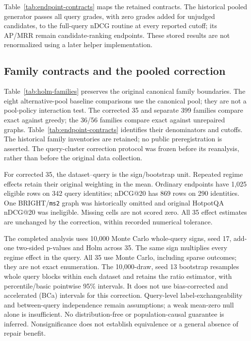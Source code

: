 \documentclass[pdflatex,sn-basic,Numbered]{sn-jnl}
\begin{document}
Table~\ref{tab:endpoint-contracts} maps the retained contracts. The historical pooled generator passes all query grades, with zero grades added for unjudged candidates, to the full-query nDCG routine at every reported cutoff; its AP/MRR remain candidate-ranking endpoints. These stored results are not renormalized using a later helper implementation.


\subsection{Family contracts and the pooled correction}
Table~\ref{tab:holm-families} preserves the original canonical family boundaries. The eight alternative-pool baseline comparisons use the canonical pool; they are not a pool-policy interaction test. The corrected 35 and separate 399 families compare exact against greedy; the 36/56 families compare exact against unrepaired graphs. Table~\ref{tab:endpoint-contracts} identifies their denominators and cutoffs. The historical family inventories are retained; no public preregistration is asserted. The query-cluster correction protocol was frozen before its reanalysis, rather than before the original data collection.


For corrected 35, the dataset--query is the sign/bootstrap unit. Repeated regime effects retain their original weighting in the mean. Ordinary endpoints have 1,025 eligible rows on 342 query identities; nDCG@20 has 869 rows on 290 identities. One BRIGHT/\texttt{ms2} graph was historically omitted and original HotpotQA nDCG@20 was ineligible. Missing cells are not scored zero. All 35 effect estimates are unchanged by the correction, within recorded numerical tolerance.

The completed analysis uses 10,000 Monte Carlo whole-query signs, seed 17, add-one two-sided p-values and Holm across 35. The same sign multiplies every regime effect in the query. All 35 use Monte Carlo, including sparse outcomes; they are not exact enumeration. The 10,000-draw, seed 13 bootstrap resamples whole query blocks within each dataset and retains the ratio estimator, with percentile/basic pointwise 95\% intervals. It does not use bias-corrected and accelerated (BCa) intervals for this correction. Query-level label-exchangeability and between-query independence remain assumptions; a weak mean-zero null alone is insufficient. No distribution-free or population-causal guarantee is inferred. Nonsignificance does not establish equivalence or a general absence of repair benefit.
\end{document}
